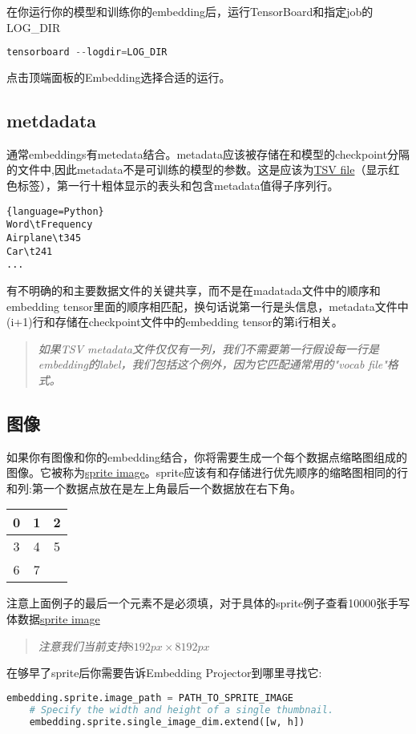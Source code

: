 在你运行你的模型和训练你的embedding后，运行TensorBoard和指定job的LOG\_DIR
\begin{lstlisting}[language=Python]
tensorboard --logdir=LOG_DIR
\end{lstlisting}
点击顶端面板的Embedding选择合适的运行。
\subsection{metdadata}
通常embeddings有metedata结合。metadata应该被存储在和模型的checkpoint分隔的文件中,因此metadata不是可训练的模型的参数。这是应该为\href{https://en.wikipedia.org/wiki/Tab-separated_values}{TSV file}（显示红色标签），第一行十粗体显示的表头和包含metadata值得子序列行。
\begin{lstlisting}{language=Python}
Word\tFrequency
Airplane\t345
Car\t241
...
\end{lstlisting}
有不明确的和主要数据文件的关键共享，而不是在madatada文件中的顺序和embedding tensor里面的顺序相匹配，换句话说第一行是头信息，metadata文件中(i+1)行和存储在checkpoint文件中的embedding tensor的第i行相关。
\begin{quote}
	\emph{如果TSV metadata文件仅仅有一列，我们不需要第一行假设每一行是embedding的label，我们包括这个例外，因为它匹配通常用的"vocab file"格式。}
\end{quote}
\subsection{图像}
如果你有图像和你的embedding结合，你将需要生成一个每个数据点缩略图组成的图像。它被称为\href{https://www.google.com/webhp#q=what+is+a+sprite+image}{sprite image}。sprite应该有和存储进行优先顺序的缩略图相同的行和列:第一个数据点放在是左上角最后一个数据放在右下角。

\begin{tabular}{|c|c|c|}
	\hline
	0&1&2\\
	\hline
	3&4&5\\
	\hline
	6&7&\\
	\hline
\end{tabular}

注意上面例子的最后一个元素不是必须填，对于具体的sprite例子查看10000张手写体数据\href{https://www.tensorflow.org/images/mnist_10k_sprite.png}{sprite image}
\begin{quote}
	\emph{注意我们当前支持$8192px\times8192px$}
\end{quote}
在够早了sprite后你需要告诉Embedding Projector到哪里寻找它:
\begin{lstlisting}[language=Python]
embedding.sprite.image_path = PATH_TO_SPRITE_IMAGE
	# Specify the width and height of a single thumbnail.
	embedding.sprite.single_image_dim.extend([w, h])
\end{lstlisting}
